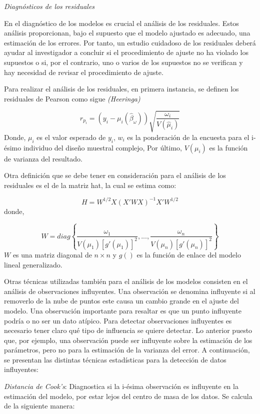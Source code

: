 \documentclass[
  12pt,
]{book}
\begin{document}
\emph{Diagnósticos de los residuales}

En el diagnóstico de los modelos es crucial el análisis de los residuales. Estos análisis proporcionan, bajo el supuesto que el modelo ajustado es
adecuado, una estimación de los errores. Por tanto, un estudio cuidadoso
de los residuales deberá ayudar al investigador a concluir si el procedimiento de ajuste no ha violado los supuestos o si, por el contrario, uno o varios de los supuestos no se verifican y hay necesidad de revisar el procedimiento de ajuste.

Para realizar el análisis de los residuales, en primera instancia, se definen los residuales de Pearson como sigue \emph{(Heeringa)}

\[
r_{p_{i}}  =  \left(y_{i}-\mu_{i}\left(\hat{\beta}_{\omega}\right)\right)\sqrt{\frac{\omega_{i}}{V\left(\hat{\mu}_{i}\right)}}
\]
Donde, \(\mu_{i}\) es el valor esperado de \(y_{i}\), \(w_{i}\) es la ponderación de la encuesta para el i-ésimo individuo del diseño muestral complejo, Por último, \(V(\mu_{i})\) es la función de varianza del resultado.

Otra definición que se debe tener en consideración para el análisis de los residuales es el de la matriz hat, la cual se estima como:

\[
H  =  W^{1/2}X\left(X'WX\right)^{-1}X'W^{1/2}
\]
donde,

\[
W  =  diag\left\{ \frac{\omega_{1}}{V\left(\mu_{1}\right)\left[g'\left(\mu_{1}\right)\right]^{2}},...,\frac{\omega_{n}}{V\left(\mu_{n}\right)\left[g'\left(\mu_{n}\right)\right]^{2}}\right\} 
\]
\(W\) es una matriz diagonal de \(n\times n\) y \(g()\) es la función de enlace del modelo lineal generalizado.

Otras técnicas utilizadas también para el análisis de los modelos consisten en el análisis de observaciones influyentes. Una observación se denomina influyente si al removerlo de la nube de puntos este causa un cambio grande en el ajuste del modelo. Una observación importante para resaltar es que un punto influyente podría o no ser un dato atípico. Para detectar observaciones influyentes es necesario tener claro qué tipo de influencia se quiere detectar. Lo anterior puesto que, por ejemplo, una observación puede ser influyente sobre la estimación de los parámetros, pero no para la estimación de la varianza del error. A continuación, se presentan las distintas técnicas estadísticas para la detección de datos influyentes:

\emph{Distancia de Cook's}: Diagnostica si la i-ésima observación es influyente
en la estimación del modelo, por estar lejos del centro de masa de los
datos. Se calcula de la siguiente manera:
\end{document}
